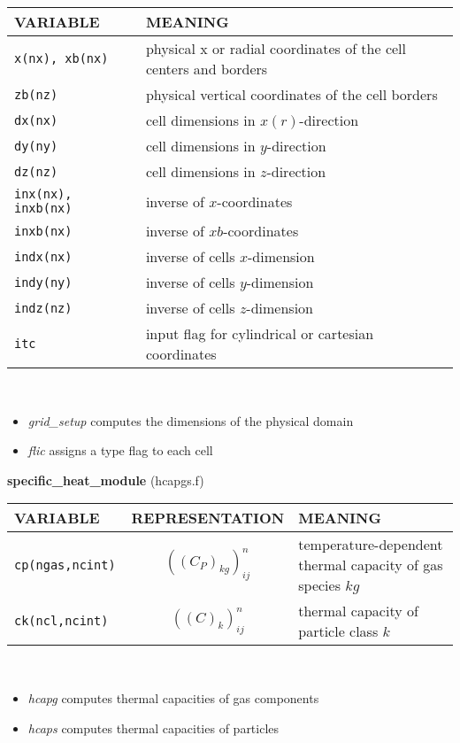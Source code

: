 \begin{tabular}{|p{6cm}|p{6cm}|}\hline
VARIABLE & MEANING\\\hline
\tt x(nx), xb(nx) & physical x or radial coordinates of the cell centers and borders \\ \hline
\tt zb(nz) & physical vertical coordinates of the cell borders \\ \hline
\tt dx(nx) & cell dimensions in $x(r)$-direction\\ \hline
\tt dy(ny) & cell dimensions in $y$-direction\\ \hline
\tt dz(nz) & cell dimensions in $z$-direction\\ \hline
\tt inx(nx), inxb(nx) & inverse of $x$-coordinates \\ \hline
\tt inxb(nx) & inverse of $xb$-coordinates \\ \hline
\tt indx(nx) & inverse of cells $x$-dimension\\ \hline
\tt indy(ny) & inverse of cells $y$-dimension\\ \hline
\tt indz(nz) & inverse of cells $z$-dimension\\ \hline
\tt itc       & input flag for cylindrical or cartesian coordinates\\ \hline
\end{tabular}\\[5mm]
\begin{itemize}
\item{\em grid\_setup} computes the dimensions of the physical domain\\
\item{\em flic} assigns a type flag to each cell\\
\end{itemize}
%
%
{\large{\bf specific\_heat\_module}} (hcapgs.f)\\[5mm]
\begin{tabular}{|p{6cm}|c|p{6cm}|}\hline
VARIABLE & REPRESENTATION & MEANING\\\hline
\tt cp(ngas,ncint) & $((C_P)_{kg})^n_{ij}$ & temperature-dependent thermal capacity of gas species $kg$\\\hline
\tt ck(ncl,ncint) & $((C)_{k})^n_{ij}$ & thermal capacity of particle class $k$\\\hline
\end{tabular}\\
\begin{itemize}
\item{\em hcapg} computes thermal capacities of gas components 
\item{\em hcaps} computes thermal capacities of particles 
\end{itemize}
